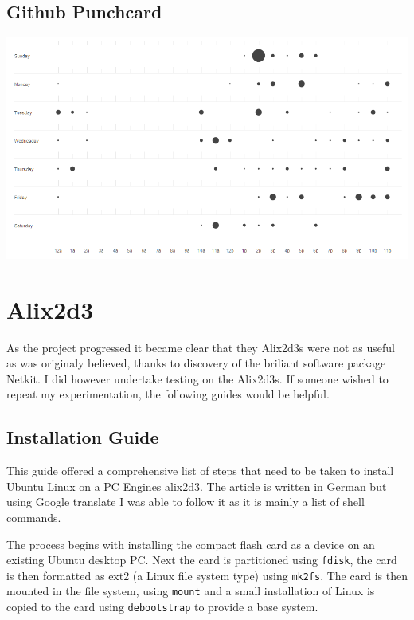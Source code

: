 \section{Github Punchcard}
\begin{center}
	\includegraphics[width=\linewidth]{../Diagrams/Stats/GitHubPunchCard.png}
\end{center}

\chapter{Alix2d3}
As the project progressed it became clear that they Alix2d3s were not as useful
as was originaly believed, thanks to discovery of the briliant software package
Netkit. I did however undertake testing on the Alix2d3s. If someone wished to
repeat my experimentation, the following guides would be helpful. 

\section{Installation Guide}

 This guide\cite{germanGuide} offered a comprehensive list of steps that need to
 be taken to install Ubuntu Linux on a PC Engines alix2d3\cite{alix2d3}.  The article is
 written in German but using Google translate I was able to follow it as it is
 mainly a list of shell commands.

 The process begins with installing the compact flash card as a device on an
 existing Ubuntu desktop PC\@. Next the card is partitioned using \texttt{fdisk},
 the card is then formatted as ext2 (a Linux file system type) using
 \texttt{mk2fs}. The card is then mounted in the file system, using
 \texttt{mount} and a small installation of Linux is copied to the card using
 \texttt{debootstrap} to provide a base system.

